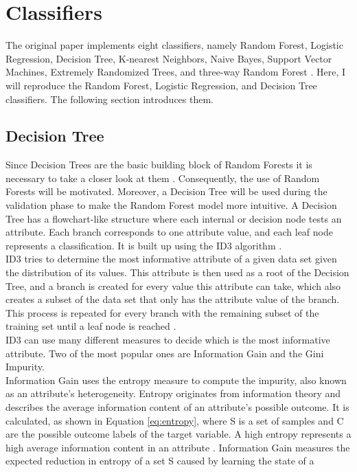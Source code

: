 \section{Classifiers}
The original paper implements eight classifiers, namely Random 
Forest, Logistic Regression, Decision Tree, K-nearest Neighbors, Naive Bayes, 
Support Vector Machines, Extremely Randomized Trees, and three-way Random 
Forest \cite{RN127}. 
Here, I will reproduce the Random Forest, Logistic Regression, and Decision 
Tree classifiers. The following section introduces them.
\subsection{Decision Tree}
Since Decision Trees are the basic building block of Random Forests it 
is necessary to take a closer look at them \cite{RN163}. Consequently, the use 
of Random Forests will be motivated. Moreover, a Decision Tree will be used 
during the validation phase to make the Random Forest model more intuitive.
A Decision Tree has a flowchart-like structure where each internal or decision 
node tests an attribute. Each branch corresponds to one attribute value, and 
each leaf node represents a classification. It is built up using the ID3 
algorithm \cite{RN171}.
\\
ID3 tries to determine the most informative attribute of a given data set given 
the distribution of its values. This attribute is then used as a root of the 
Decision Tree, and a branch is created for every value this attribute can take, 
which also creates a subset of the data set that only has the attribute value 
of the branch. This process is repeated for every branch with the remaining 
subset of the training set until a leaf node is reached \cite{RN165}.
\\
ID3 can use many different measures to decide which is the most informative 
attribute. Two of the most popular ones are Information Gain and the Gini 
Impurity.
\\
Information Gain uses the entropy measure to compute the impurity, also known 
as an attribute's heterogeneity. Entropy originates from information 
theory and describes the average information content of an attribute's possible 
outcome. It is calculated, as shown in Equation \ref{eq:entropy}, where S is a 
set of samples and C are the possible outcome labels of the target variable. A 
high entropy represents a high average 
information content in an attribute \cite{RN167}. Information Gain measures the 
expected reduction in entropy of a set S caused by learning the state of a 
